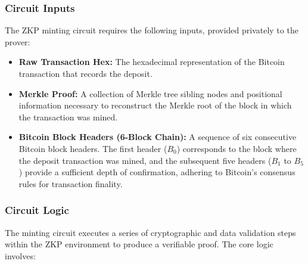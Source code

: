 \documentclass{DESSThesis}
\begin{document}
\subsubsection{Circuit Inputs}
The ZKP minting circuit requires the following inputs, provided privately to the prover:
\begin{itemize}
    \item \textbf{Raw Transaction Hex:} The hexadecimal representation of the Bitcoin transaction that records the deposit.
    \item \textbf{Merkle Proof:} A collection of Merkle tree sibling nodes and positional information necessary to reconstruct the Merkle root of the block in which the transaction was mined.
    \item \textbf{Bitcoin Block Headers (6-Block Chain):} A sequence of six consecutive Bitcoin block headers. The first header ($B_0$) corresponds to the block where the deposit transaction was mined, and the subsequent five headers ($B_1$ to $B_5$) provide a sufficient depth of confirmation, adhering to Bitcoin's consensus rules for transaction finality.
\end{itemize}

\subsubsection{Circuit Logic}
The minting circuit executes a series of cryptographic and data validation steps within the ZKP environment to produce a verifiable proof. The core logic involves:
\end{document}

